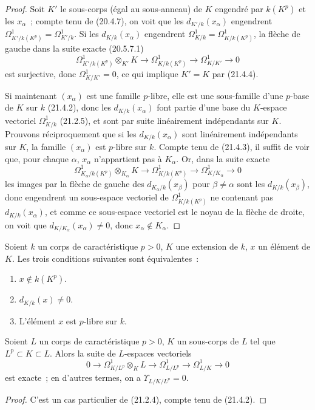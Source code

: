 \begin{proof}
Soit $K'$ le sous-corps (égal au sous-anneau) de $K$ engendré par
$k(K^p)$ et les $x_\alpha$~; compte tenu de (20.4.7), on voit que les
$d_{K'/k}(x_\alpha)$ engendrent $\Omega^1_{K'/k(K^p)}=\Omega^1_{K'/k}$. Si les
$d_{K/k}(x_\alpha)$ engendrent $\Omega^1_{K/k}=\Omega^1_{K/k(K^p)}$, la flèche de
gauche dans la suite exacte (20.5.7.1)
\[
\Omega^1_{K'/k(K^p)}\otimes_{K'}K\to\Omega^1_{K/k(K^p)}\to\Omega^1_{K/K'}\to0
\]
est surjective, donc $\Omega^1_{K/K'}=0$, ce qui implique $K'=K$ par (21.4.4).

Si maintenant $(x_\alpha)$ est une famille $p$-libre, elle est une sous-famille
d'une $p$-base de $K$ sur $k$ (21.4.2), donc les $d_{K/k}(x_\alpha)$ font partie
d'une base du $K$-espace vectoriel $\Omega^1_{K/k}$ (21.2.5), et sont par suite
linéairement indépendants sur $K$. Prouvons réciproquement que si les
$d_{K/k}(x_\alpha)$ sont linéairement indépendants sur $K$, la famille
$(x_\alpha)$ est $p$-libre sur $k$.
Compte tenu de (21.4.3), il suffit de voir que,
pour chaque $\alpha$, $x_\alpha$ n'appartient pas à $K_\alpha$. Or, dans la
suite exacte
\[
\Omega^1_{K_\alpha/k(K^p)}\otimes_{K_\alpha}K\longrightarrow
\Omega^1_{K/k(K^p)}\longrightarrow\Omega^1_{K/K_\alpha}\longrightarrow0
\]
les images par la flèche de gauche des $d_{K_\alpha/k}(x_\beta)$ pour
$\beta\neq\alpha$ sont les $d_{K/k}(x_\beta)$, donc engendrent un sous-espace
vectoriel de $\Omega^1_{K/k(K^p)}$ ne contenant pas $d_{K/k}(x_\alpha)$, et comme
ce sous-espace vectoriel est le noyau de la flèche de droite, on voit que
$d_{K/K_\alpha}(x_\alpha)\neq0$, donc $x_\alpha\notin K_\alpha$.
\end{proof}

\begin{corollary}[21.4.6]
\label{0.21.4.6-fr}
Soient $k$ un corps de caractéristique $p>0$, $K$ une extension de $k$,
$x$ un élément de $K$. Les trois conditions suivantes sont équivalentes~:
\begin{enumerate}
  \item[\textup{a)}] $x\notin k(K^p)$.
  \item[\textup{b)}] $d_{K/k}(x)\neq0$.
  \item[\textup{c)}] L'élément $x$ est $p$-libre sur $k$.
\end{enumerate}
\end{corollary}

\begin{proposition}[21.4.7]
\label{0.21.4.7-fr}
Soient $L$ un corps de caractéristique $p>0$, $K$ un sous-corps de $L$ tel
que $L^p\subset K\subset L$. Alors la suite de $L$-espaces vectoriels
\begin{equation}
\tag{21.4.7.1}\label{0.21.4.7.1-fr}
0\to\Omega^1_{K/L^p}\otimes_KL\to\Omega^1_{L/L^p}
\to\Omega^1_{L/K}\to0
\end{equation}
est exacte~; en d'autres termes, on a $\Upsilon_{L/K/L^p}=0$.
\end{proposition}
\begin{proof}
C'est un cas particulier de (21.2.4), compte tenu de (21.4.2).
\end{proof}

